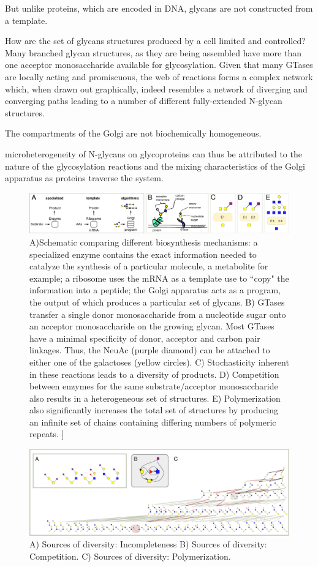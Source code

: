 \documentclass[twocolumn]{article}
\begin{document}
But unlike proteins, which are encoded in DNA, glycans are not constructed from a template.

How are the set of glycans structures produced by a cell limited and controlled? Many branched glycan structures, as they are being assembled have more than one acceptor monosaccharide available for glycosylation. Given that many GTases are locally acting and promiscuous, the
web of reactions
forms a complex network which, when drawn out graphically,
indeed resembles a network of diverging and converging paths
leading to a number of different fully-extended N-glycan structures. 


The compartments of the Golgi are not biochemically homogeneous.


microheterogeneity of N-glycans on glycoproteins can
thus be attributed to the nature of the glycosylation reactions and the mixing characteristics of the Golgi apparatus as proteins traverse the system.

\begin{figure}
    \includegraphics[width=\textwidth]{Figure_1.pdf}
	\caption {A)Schematic comparing different biosynthesis mechanisms: a specialized enzyme contains the exact information needed to catalyze the synthesis of a particular molecule, a metabolite for example; a ribosome uses the mRNA as a template use to ``copy" the information into a peptide; the Golgi apparatus acts as a program, the output of which produces a particular set of glycans. B) GTases transfer a single donor monosaccharide from a nucleotide sugar onto an acceptor monosaccharide on the growing glycan. Most GTases have a minimal specificity of donor, acceptor and carbon pair linkages. Thus, the NeuAc (purple diamond) can be attached to either one of the galactoses (yellow circles). C) Stochasticity inherent in these reactions leads to a diversity of products. D) Competition between enzymes for the same substrate/acceptor monosaccharide also results in a heterogeneous set of structures. E) Polymerization also significantly increases the total set of structures by producing an infinite set of chains containing differing numbers of polymeric repeats. ]}
\end{figure}


\begin{figure}
    \includegraphics[width=\textwidth]{Figure_2.pdf}
	\caption{A) Sources of diversity: Incompleteness B) Sources of diversity: Competition. C) Sources of diversity: Polymerization.}
\end{figure}
\end{document}
